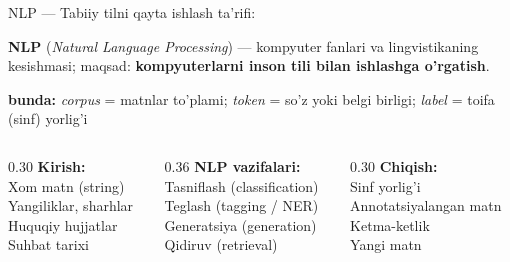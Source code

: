 \documentclass[aspectratio=169,11pt]{beamer}
\newcommand{\bunda}[1]{{\small\textbf{bunda:}\; #1}}
\begin{document}
\begin{frame}{NLP --- Tabiiy tilni qayta ishlash ta'rifi:}
  \begin{tcolorbox}[defbox,title=Ta'rif: NLP (Tabiiy tilni qayta ishlash)]
    \textbf{NLP} (\textit{Natural Language Processing}) ---
    kompyuter fanlari va lingvistikaning kesishmasi;
    maqsad: \textbf{kompyuterlarni inson tili bilan ishlashga o'rgatish}.
  \end{tcolorbox}
  \vspace{5pt}
  \bunda{%
    \textit{corpus} = matnlar to'plami;
    \textit{token} = so'z yoki belgi birligi;
    \textit{label} = toifa (sinf) yorlig'i
  }
  \vspace{5pt}
  \begin{columns}[T]
    \begin{column}{0.30\textwidth}
      \textbf{Kirish:}\\[3pt]
      \footnotesize
      Xom matn (string)\\
      Yangiliklar, sharhlar\\
      Huquqiy hujjatlar\\
      Suhbat tarixi
    \end{column}
    \begin{column}{0.36\textwidth}
      \textbf{NLP vazifalari:}\\[3pt]
      \footnotesize
      Tasniflash (classification)\\
      Teglash (tagging / NER)\\
      Generatsiya (generation)\\
      Qidiruv (retrieval)
    \end{column}
    \begin{column}{0.30\textwidth}
      \textbf{Chiqish:}\\[3pt]
      \footnotesize
      Sinf yorlig'i\\
      Annotatsiyalangan matn\\
      Ketma-ketlik\\
      Yangi matn
    \end{column}
  \end{columns}
\end{frame}
\end{document}
